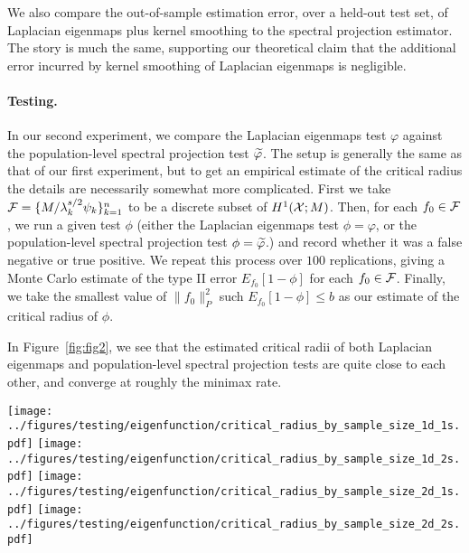 We also compare the out-of-sample estimation error, over a held-out test set, of Laplacian eigenmaps plus kernel smoothing to the spectral projection estimator. The story is much the same, supporting our theoretical claim that the additional error incurred by kernel smoothing of Laplacian eigenmaps is negligible.

\paragraph{Testing.} 
In our second experiment, we compare the Laplacian eigenmaps test $\varphi$ against the  population-level spectral projection test $\widetilde{\varphi}$. The setup is generally the same as that of our first experiment, but to get an empirical estimate of the critical radius the details are necessarily somewhat more complicated. First we take $\mathcal{F} = \{M/\lambda_k^{s/2} \psi_k\}_{k = 1}^{n}$ to be a discrete subset of $H^1(\mathcal{X};M)$. Then, for each $f_0 \in \mathcal{F}$, we run a given test $\phi$ (either the Laplacian eigenmaps test $\phi = \varphi$, or the population-level spectral projection test $\phi = \widetilde{\varphi}$.) and record whether it was a false negative or true positive. We repeat this process over $100$ replications, giving a Monte Carlo estimate of the type II error $E_{f_0}[1 - \phi]$ for each $f_0 \in \mathcal{F}$. Finally, we take the smallest value of $\|f_0\|_P^2$ such $E_{f_0}[1 - \phi] \leq b$ as our estimate of the critical radius of $\phi$. 

In Figure~\ref{fig:fig2}, we see that the estimated critical radii of both Laplacian eigenmaps and population-level spectral projection tests are quite close to each other, and converge at roughly the minimax rate.
\begin{figure*}[tb]
	\texttt{[image: ../figures/testing/eigenfunction/critical\_radius\_by\_sample\_size\_1d\_1s.pdf]}
	\texttt{[image: ../figures/testing/eigenfunction/critical\_radius\_by\_sample\_size\_1d\_2s.pdf]}
	\texttt{[image: ../figures/testing/eigenfunction/critical\_radius\_by\_sample\_size\_2d\_1s.pdf]}
	\texttt{[image: ../figures/testing/eigenfunction/critical\_radius\_by\_sample\_size\_2d\_2s.pdf]}
	\caption{Worst-case testing risk Laplacian eigenmaps (\texttt{LE}) and spectral projection (\texttt{SP}) tests, as a function of sample size $n$. Plots are on the same scale as Figure~\ref{fig:fig1}, and black line shows the minimax rate. All tests are set to have $.05$ Type I error, and are calibrated by simulation under the null.}
	\label{fig:fig2}
\end{figure*}

